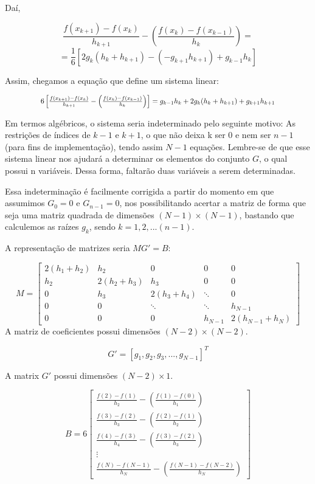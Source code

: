 \documentclass[11pt]{article}
\begin{document}
Daí,

$$\frac{f(x_{k+1}) - f(x_k)}{h_{k+1}} - \left( \frac{f(x_k) - f(x_{k-1})}{h_k} \right) = $$
$$ = \frac{1}{6}[ 2g_k(h_k + h_{k+1}) - (- g_{k+1}h_{k+1}) + g_{k-1}h_k ] $$

Assim, chegamos a equação que define um sistema linear:

\begin{equation}
\resizebox{.8\hsize}{!}{$6\left[\frac{f(x_{k+1}) - f(x_k)}{h_{k+1}} - \left( \frac{f(x_k) - f(x_{k-1})}{h_k} \right)\right] = g_{k-1}h_k + 2g_k(h_k + h_{k+1}) + g_{k+1}h_{k+1}$}
\end{equation}

Em termos algébricos, o sistema seria indeterminado pelo seguinte motivo:
As restrições de índices de ${k-1}$ e ${k+1}$, o que não deixa k ser 0 e nem
ser $n-1$ (para fins de implementação), tendo assim $N-1$ equações.
Lembre-se de que esse sistema linear nos ajudará a determinar os elementos do
conjunto $G$, o qual possui n variáveis.
Dessa forma, faltarão duas variáveis a serem determinadas.

Essa indeterminação é facilmente corrigida a partir do momento em que
assumimos $G_0 = 0$ e $G_{n-1} = 0$, nos possibilitando acertar a matriz
de forma que seja uma matriz quadrada de dimensões $(N-1) \times (N-1)$,
bastando que calculemos as raízes $g_k$, sendo $k = 1, 2, ... (n-1)$.

A representação de matrizes seria $MG' = B$:
 
\[
M = 
\begin{bmatrix}
	2(h_1 + h_2) & h_2 & 0 & 0 & 0\\
	h_2 & 2(h_2 + h_3) & h_3 & 0 & 0\\
	0 & h_3 & 2(h_3 + h_4) & \ddots & 0 \\
	0 & 0 & \ddots & \ddots & h_{N-1} \\
	0 & 0 & 0 & h_{N-1} & 2(h_{N-1} + h_N)
\end{bmatrix}
\]
A matriz de coeficientes possui dimensões $(N-2) \times (N-2)$.

$$G' = [g_1, g_2, g_3, ..., g_{N-1}]^T$$

A matrix $G'$ possui dimensões $(N-2) \times 1$.

\[
B = 6
\begin{bmatrix}
	\frac{f(2) - f(1)}{h_2} - \left( \frac{f(1) - f(0)}{h_1} \right)\\
	\frac{f(3) - f(2)}{h_3} - \left( \frac{f(2) - f(1)}{h_2} \right)\\
	\frac{f(4) - f(3)}{h_4} - \left( \frac{f(3) - f(2)}{h_3} \right)\\
	\vdots\\
	\frac{f(N) - f(N-1)}{h_N} - \left( \frac{f(N-1) - f(N-2)}{h_N} \right)
\end{bmatrix}
\]
\end{document}
